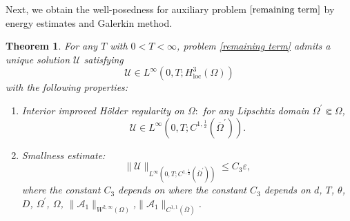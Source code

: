 \documentclass[11pt,reqno,oneside]{amsart}
\numberwithin{equation}{section}
\newtheorem{theorem}{Theorem}[section]
\theoremstyle{definition}
\theoremstyle{remark}
\numberwithin{equation}{section}
\begin{document}
	
	Next, we obtain the well-posedness for auxiliary problem $\eqref{remaining term}$ by energy estimates and Galerkin method. 
	\begin{theorem}\label{3.1}
		For any $T$ with $0<T<\infty$, problem \eqref{remaining term} admits a unique solution $\mathcal{U}$ satisfying
		$$ 	\mathcal{U}\in L^{\infty}\left(0,T;H^{3}_{\mathrm{loc}}(\Omega)\right)$$ 
		with the following properties:
		\begin{enumerate}
			\item Interior improved H\"older regularity on $\Omega:$ for any  Lipschtiz domain $\Omega^\prime \Subset \Omega$,
			\begin{equation*}
				\mathcal{U} \in L^{\infty}(0,T;C^{1,\frac{1}{2}}(\overline{\Omega}^{\prime})). 
			\end{equation*} 
			\item  Smallness estimate:
			\begin{equation*}
				\|\mathcal{U}\|_{L^{\infty}(0,T;C^{1,\frac{1}{2}}(\overline{\Omega}^{\prime})) }\leqslant C_3 \varepsilon ,
			\end{equation*}
			where the constant $C_3$ depends on where the constant $C_3$ depends on $d$, $T$, $\theta$, $D$, $\Omega^\prime$, $\Omega$, $\|\mathscr{A}_1\|_{W^{2,\infty}(\Omega)}$,$\|\mathscr{A}_1\|_{C^{1,1}(\overline{\Omega})}$.
		\end{enumerate}
	\end{theorem}
\end{document}
